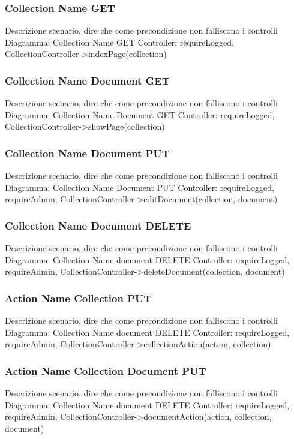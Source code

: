 \subsubsection{Collection Name GET}
Descrizione scenario, dire che come precondizione non falliscono i controlli
Diagramma: Collection Name GET
Controller: requireLogged, CollectionController->indexPage(collection)

\subsubsection{Collection Name Document GET}
Descrizione scenario, dire che come precondizione non falliscono i controlli
Diagramma: Collection Name Document GET
Controller: requireLogged, CollectionController->showPage(collection)

\subsubsection{Collection Name Document PUT}
Descrizione scenario, dire che come precondizione non falliscono i controlli
Diagramma: Collection Name Document PUT
Controller: requireLogged, requireAdmin, CollectionController->editDocument(collection, document)

\subsubsection{Collection Name Document DELETE}
Descrizione scenario, dire che come precondizione non falliscono i controlli
Diagramma: Collection Name document DELETE
Controller: requireLogged, requireAdmin, CollectionController->deleteDocument(collection, document)

\subsubsection{Action Name Collection PUT}
Descrizione scenario, dire che come precondizione non falliscono i controlli
Diagramma: Collection Name document DELETE
Controller: requireLogged, requireAdmin, CollectionController->collectionAction(action, collection)

\subsubsection{Action Name Collection Document PUT}
Descrizione scenario, dire che come precondizione non falliscono i controlli
Diagramma: Collection Name document DELETE
Controller: requireLogged, requireAdmin, CollectionController->documentAction(action, collection, document)
